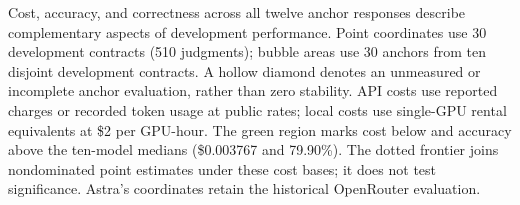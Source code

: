 Cost, accuracy, and correctness across all twelve anchor responses describe complementary aspects of development performance. Point coordinates use 30 development contracts (510 judgments); bubble areas use 30 anchors from ten disjoint development contracts. A hollow diamond denotes an unmeasured or incomplete anchor evaluation, rather than zero stability. API costs use reported charges or recorded token usage at public rates; local costs use single-GPU rental equivalents at \$2 per GPU-hour. The green region marks cost below and accuracy above the ten-model medians (\$0.003767 and 79.90\%). The dotted frontier joins nondominated point estimates under these cost bases; it does not test significance. Astra's coordinates retain the historical OpenRouter evaluation.
